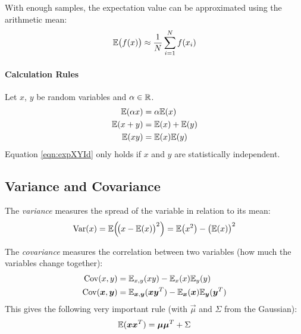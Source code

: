 			With enough samples, the expectation value can be approximated using the arithmetic mean:
			\begin{equation}
				\mathbb{E}\big(f(x)\big) \approx \frac{1}{N} \sum_{i = 1}^{N} f(x_i)
			\end{equation}

			\paragraph{Calculation Rules}
				Let \(x\), \(y\) be random variables and \(\alpha \in \mathbb{R}\).
				\begin{align}
					\mathbb{E}(\alpha x) & = \alpha \mathbb{E}(x)                    \\
					\mathbb{E}(x + y)    & = \mathbb{E}(x) + \mathbb{E}(y)                   \\
					\mathbb{E}(xy)       & = \mathbb{E}(x) \mathbb{E}(y) \label{eqn:expXYId}
				\end{align}
				Equation \ref{eqn:expXYId} only holds if \(x\) and \(y\) are statistically independent.

		\subsection{Variance and Covariance}
			The \emph{variance} measures the spread of the variable in relation to its mean:
			\begin{equation}
				\operatorname{Var}(x) = \mathbb{E}\Big(\!\big( x - \mathbb{E}(x) \big)^2 \Big) = \mathbb{E}\big(x^2\big) - \big(\mathbb{E}(x)\big)^2
			\end{equation}

			The \emph{covariance} measures the correlation between two variables (how much the variables change together):
			\begin{align}
				\operatorname{Cov}(x, y)             & = \mathbb{E}_{x,y}(xy) - \mathbb{E}_x(x) \mathbb{E}_y(y)                                                         \\
				\operatorname{Cov}(\bm{x}, \bm{y}) & = \mathbb{E}_{\bm{x},\bm{y}}(\bm{x}\bm{y}^T) - \mathbb{E}_{\bm{x}}(\bm{x}) \mathbb{E}_{\bm{y}}(\bm{y}^T)
			\end{align}
			This gives the following very important rule (with \(\vec{\mu}\) and \(\Sigma\) from the Gaussian):
			\begin{equation}
				\mathbb{E}(\bm{x}\bm{x}^T) = \bm{\mu}\bm{\mu}^T + \Sigma
			\end{equation}


